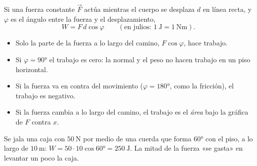 \documentclass[11pt,a4paper]{article}
\begin{document}
\begin{minipage}[c]{0.54\linewidth}
\begin{definicion}
Si una fuerza constante $\vec F$ actúa mientras el cuerpo se desplaza $d$ en línea recta, y $\varphi$ es el ángulo
entre la fuerza y el desplazamiento,
\[ W=F\,d\cos\varphi\qquad(\text{en julios: }\SI{1}{\joule}=\SI{1}{\newton\meter}). \]
\end{definicion}
\end{minipage}\hfill
\begin{minipage}[c]{0.42\linewidth}\centering
{}
\end{minipage}

\begin{itemize}
\item Solo la parte de la fuerza a lo largo del camino, $F\cos\varphi$, hace trabajo.
\item Si $\varphi=\ang{90}$ el trabajo es cero: la normal y el peso no hacen trabajo en un piso horizontal.
\item Si la fuerza va en contra del movimiento ($\varphi=\ang{180}$, como la fricción), el trabajo es negativo.
\item Si la fuerza cambia a lo largo del camino, el trabajo es el \emph{área} bajo la gráfica de $F$ contra $x$.
\end{itemize}
\begin{ejemplo}
Se jala una caja con $\SI{50}{\newton}$ por medio de una cuerda que forma \ang{60} con el piso, a lo largo de $\SI{10}{\meter}$:
$W=50\cdot10\cos\ang{60}=\SI{250}{\joule}$. La mitad de la fuerza «se gasta» en levantar un poco la caja.
\end{ejemplo}
\end{document}
